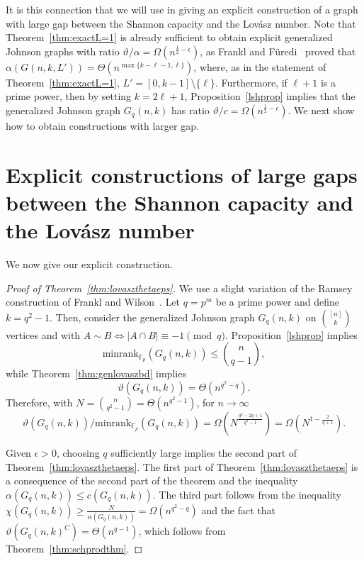 \documentclass[11pt]{article}
\theoremstyle{definition}
\theoremstyle{remark}
\begin{document}
It is this connection that we will use in giving an explicit construction of a graph with large gap between the Shannon capacity and the Lov\'asz number. Note that Theorem~\ref{thm:exactL=1} is already sufficient to obtain explicit generalized Johnson graphs with ratio $\vartheta/\alpha = \Omega(n^{\frac12 - \epsilon})$, as Frankl and F\"{u}redi~\cite{FF} proved that $\alpha(G(n, k, L')) = \Theta(n^{\max\{k-\ell-1, \ell\}})$, where, as in the statement of Theorem~\ref{thm:exactL=1}, $L' = [0, k-1]\setminus\{\ell\}$.  Furthermore, if $\ell+1$ is a prime power, then by setting $k=2\ell+1$, Proposition~\ref{lshprop} implies that the generalized Johnson graph $G_{q}(n, k)$ has ratio $\vartheta/c = \Omega(n^{\frac12 - \epsilon})$. We next show how to obtain constructions with larger gap.

\section{Explicit constructions of large gaps between the Shannon capacity and the Lov\'asz number}

We now give our explicit construction. 





\begin{proof}[Proof of Theorem~\ref{thm:lovaszthetaeps}] 
We use a slight variation of the Ramsey construction of Frankl and Wilson~\cite{FW1981}. Let $q = p^m$ be a prime power and define $k = q^2 - 1$. Then, consider the generalized Johnson graph $G_q(n, k)$ on $\binom{[n]}{k}$ vertices and with $A\sim B \iff |A\cap B|\equiv -1\pmod{q}$. Proposition~\ref{lshprop} implies
\[\text{minrank}_{\mathbb{F}_p}(G_q(n, k)) \le \binom{n}{q-1},\]
while Theorem~\ref{thm:genlovaszbd} implies 
\[\vartheta(G_q(n, k)) = \Theta(n^{q^2-q}).\]
Therefore, with $N = \binom{n}{q^2-1} = \Theta(n^{q^2-1})$, for $n \rightarrow \infty$
\[\vartheta(G_q(n, k))/\text{minrank}_{\mathbb{F}_p}(G_q(n, k)) = \Omega(N^{\frac{q^2-2q+1}{q^2 - 1}}) = \Omega(N^{1-\frac{2}{q+1}}).\]

Given $\epsilon > 0$, choosing $q$ sufficiently large implies the second part of Theorem~\ref{thm:lovaszthetaeps}. The first part of Theorem~\ref{thm:lovaszthetaeps} is a consequence of the second part of the theorem and the inequality $\alpha(G_q(n, k)) \le c(G_q(n, k))$. The third part follows from the inequality $\chi(G_q(n, k)) \ge \frac{N}{\alpha(G_q(n, k))}= \Omega(n^{q^2-q})$ and the fact that $\vartheta(G_q(n, k)^C) = \Theta(n^{q-1})$, which follows from Theorem~\ref{thm:schprodthm}.  
\end{proof}
\end{document}
